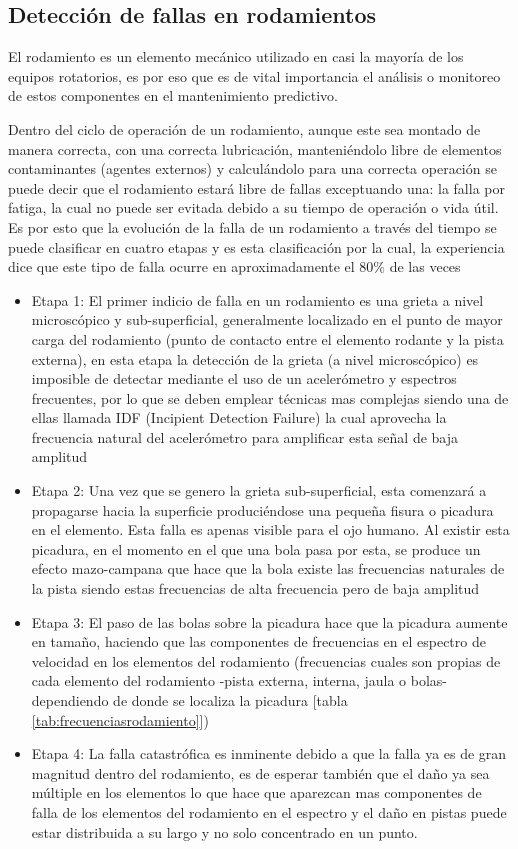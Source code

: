   		\subsection{Detección de fallas en rodamientos}
 			El rodamiento es un elemento mecánico utilizado en casi la mayoría de los equipos rotatorios, es por eso que es de vital importancia el análisis o monitoreo de estos componentes en el mantenimiento predictivo.
 			
 			Dentro del ciclo de operación de un rodamiento, aunque este sea montado de manera correcta, con una correcta lubricación, manteniéndolo libre de elementos contaminantes (agentes externos) y calculándolo para una correcta operación se puede decir que el rodamiento estará libre de fallas exceptuando una: la falla por fatiga, la cual no puede ser evitada debido a su tiempo de operación o vida útil. Es por esto que la evolución de la falla de un rodamiento a través del tiempo se puede clasificar en cuatro etapas y es esta clasificación por la cual, la experiencia dice que este tipo de falla ocurre en aproximadamente el $80\%$ de las veces
 			\begin{itemize}
 				\item Etapa 1: El primer indicio de falla en un rodamiento es una grieta a nivel microscópico y sub-superficial, generalmente localizado en el punto de mayor carga del rodamiento (punto de contacto entre el elemento rodante y la pista externa), en esta etapa la detección de la grieta (a nivel microscópico) es imposible de detectar mediante el uso de un acelerómetro y espectros frecuentes, por lo que se deben emplear técnicas mas complejas siendo una de ellas llamada IDF (Incipient Detection Failure) la cual aprovecha la frecuencia natural del acelerómetro para amplificar esta señal de baja amplitud 
 				\item Etapa 2: Una vez que se genero la grieta sub-superficial, esta comenzará a propagarse hacia la superficie produciéndose una pequeña fisura o picadura en el elemento. Esta falla es apenas visible para el ojo humano. Al existir esta picadura, en el momento en el que una bola pasa por esta, se produce un efecto mazo-campana que hace que la bola existe las frecuencias naturales de la pista siendo estas frecuencias de alta frecuencia pero de baja amplitud
 				\item Etapa 3: El paso de las bolas sobre la picadura hace que la picadura aumente en tamaño, haciendo que las componentes de frecuencias en el espectro de velocidad en los elementos del rodamiento (frecuencias cuales son propias de cada elemento del rodamiento -pista externa, interna, jaula o bolas- dependiendo de donde se localiza la picadura [tabla \ref{tab:frecuenciasrodamiento}]) 
 				\item Etapa 4: La falla catastrófica es inminente debido a que la falla ya es de gran magnitud dentro del rodamiento, es de esperar también que el daño ya sea múltiple en los elementos lo que hace que aparezcan mas componentes de falla de los elementos del rodamiento en el espectro y el daño en pistas puede estar distribuida a su largo y no solo concentrado en un punto.
 			\end{itemize}
